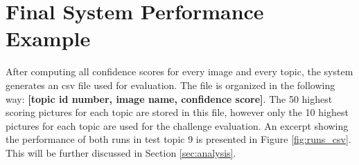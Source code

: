 \section{Final System Performance Example}
\label{sec:example}

After computing all confidence scores for every image and every topic, the system generates an csv file used for evaluation. The file is organized in the following way: \textbf{[topic id number, image name, confidence score]}. The 50 highest scoring pictures for each topic are stored in this file, however only the 10 highest pictures for each topic are used for the challenge evaluation. An excerpt showing the performance of both runs in test topic 9 is presented in Figure \ref{fig:runs_csv}. This will be further discussed in Section \ref{sec:analysis}.


\begin{figure}[H]
  \centering
  \captionsetup{justification=centering}


\end{figure}
